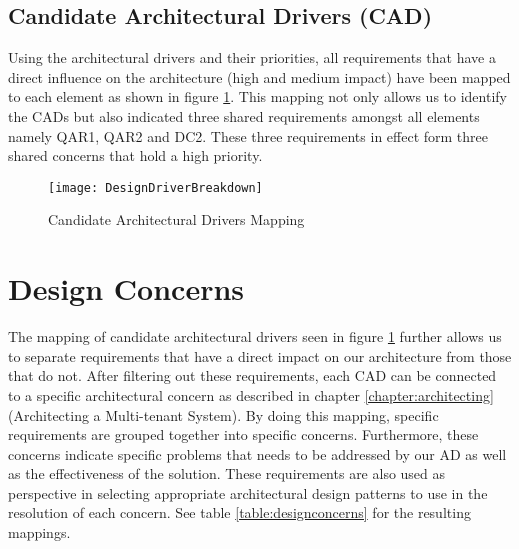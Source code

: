 \subsection{Candidate Architectural Drivers (CAD)}
Using the architectural drivers and their priorities, all requirements that have a direct influence on the architecture (high and medium impact) have been mapped to each element as shown in figure \ref{fig:designconcernmapping}. This mapping not only allows us to identify the CADs but also indicated three shared requirements amongst all elements namely QAR1, QAR2 and DC2. These three requirements in effect form three shared concerns that hold a high priority.


\begin{figure}
\centering
\texttt{[image: DesignDriverBreakdown]}
\caption{Candidate Architectural Drivers Mapping}
\label{fig:designconcernmapping}
\end{figure}

\section{Design Concerns}
\label{sec:designconcerns}
The mapping of candidate architectural drivers seen in figure \ref{fig:designconcernmapping} further allows us to separate requirements that have a direct impact on our architecture from those that do not. After filtering out these requirements, each CAD can be connected to a specific architectural concern as described in chapter \ref{chapter:architecting} (Architecting a Multi-tenant System). By doing this mapping, specific requirements are grouped together into specific concerns. Furthermore, these concerns indicate specific problems that needs to be addressed by our AD as well as the effectiveness of the solution. These requirements are also used as perspective in selecting appropriate architectural design patterns to use in the resolution of each concern. See table \ref{table:designconcerns} for the resulting mappings. 


